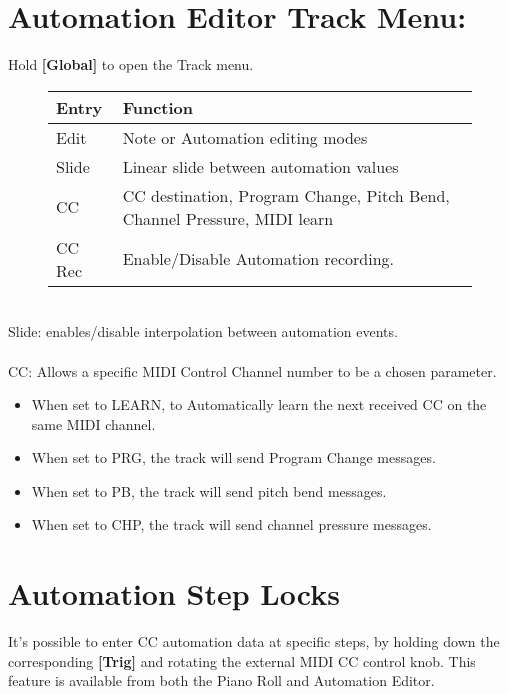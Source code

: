 \section{Automation Editor Track Menu:}
Hold \textbf{[Global]} to open the Track menu.
\begin{figure}[hb]
    \begin{tabular}{|l|l|}
    \hline
    \rowcolor[HTML]{C0C0C0}
    Entry        & Function \\ \hline
    Edit         & Note or Automation editing modes\\ \hline
    Slide      & Linear slide between automation values \\ \hline
    CC         & CC destination, Program Change, Pitch Bend, Channel Pressure,  MIDI learn \\ \hline
    CC Rec      & Enable/Disable Automation recording.\\ \hline
    \end{tabular}
\end{figure}
\\
Slide: enables/disable interpolation between automation events.\\\\
CC: Allows a specific MIDI Control Channel number to be a chosen parameter.
\begin{itemize}
    \item When set to LEARN, to Automatically learn the next received CC on the same MIDI channel.
    \item When set to PRG, the track will send Program Change messages.
    \item When set to PB, the track will send pitch bend messages.
    \item When set to CHP, the track will send channel pressure messages.
\end{itemize}

\section{Automation Step Locks}
It's possible to enter CC automation data at specific steps, by holding down the corresponding \textbf{[Trig]} and rotating the external MIDI CC control knob. This feature is available from both the Piano Roll and Automation Editor.


